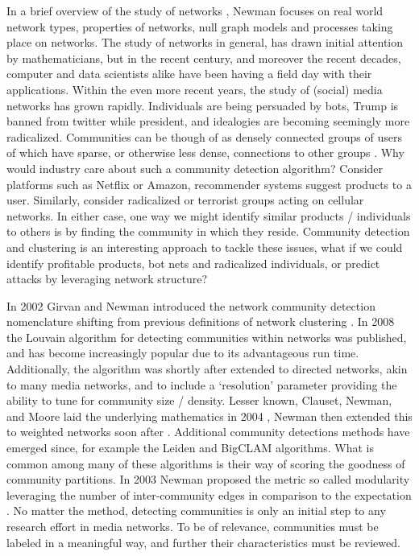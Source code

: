 \documentclass[a4paper, 10pt, twocolumn]{article}
\begin{document}
In a brief overview of the study of networks \cite{struc_funct_cnets}, Newman focuses on real world network types, properties of networks, null graph models and processes taking place on networks. 
The study of networks in general, has drawn initial attention by mathematicians, but in the recent century, and moreover the recent decades, computer and data scientists alike have been having a field day with their applications. 
Within the even more recent years, the study of (social) media networks has grown rapidly. 
Individuals are being persuaded by bots, Trump is banned from twitter while president, and idealogies are becoming seemingly more radicalized. 
Communities can be though of as densely connected groups of users of which have sparse, or otherwise less dense, connections to other groups \cite{com_struct_in_soc_and_bio}.
Why would industry care about such a community detection algorithm? 
Consider platforms such as Netflix or Amazon, recommender systems suggest products to a user. 
Similarly, consider radicalized or terrorist groups acting on cellular networks. 
In either case, one way we might identify similar products / individuals to others is by finding the community in which they reside. 
Community detection and clustering is an interesting approach to tackle these issues, what if we could identify profitable products, bot nets and radicalized individuals, or predict attacks by leveraging network structure?

In 2002 Girvan and Newman introduced the network community detection nomenclature shifting from previous definitions of network clustering \cite{com_struct_in_soc_and_bio}. 
In 2008 the Louvain algorithm \cite{louvain} for detecting communities within networks was published, and has become increasingly popular due to its advantageous run time. 
Additionally, the algorithm was shortly after extended to directed networks, akin to many media networks, and to include a `resolution' parameter \cite{louvain_resolution, com_struct_indir} providing the ability to tune for community size / density. 
Lesser known, Clauset, Newman, and Moore laid the underlying mathematics in 2004 \cite{finding_comm_struct}, Newman then extended this to weighted networks soon after \cite{analysis_of_wnets}. 
Additional community detections methods have emerged since, for example the Leiden \cite{louvain_2_leiden} and BigCLAM \cite{bigclam} algorithms. 
What is common among many of these algorithms is their way of scoring the goodness of community partitions. 
In 2003 Newman proposed the metric so called modularity leveraging the number of inter-community edges in comparison to the expectation \cite{finding_and_evaling_comm_struct}.
No matter the method, detecting communities is only an initial step to any research effort in media networks. 
To be of relevance, communities must be labeled in a meaningful way, and further their characteristics must be reviewed. 
\end{document}
